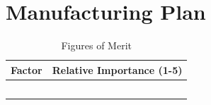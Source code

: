 \documentclass[report]{byu-aero}
\begin{document}








\section{Manufacturing Plan} %
\label{sec:ManufacturingPlan}

\begin{table}[h!]
	\centering
	\caption{Figures of Merit}
	\label{tab:fomman}
	\begin{tabular}{ |c|c| } 
		\hline
		\rowcolor{BYUbluemid}
    	Factor & Relative Importance (1-5) \\ 
		\hline
	     &  \\ 
		\hline
		 &  \\ 
		\hline
		 &  \\ 
		\hline
		 &  \\ 
		\hline
		 &  \\ 
		\hline
	\end{tabular}
\end{table}
\end{document}
